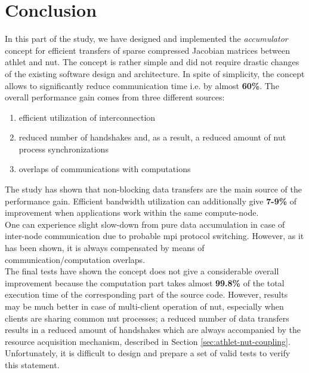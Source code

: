 \section{Conclusion}
\label{sec:accumulator-conclusions}


In this part of the study, we have designed and implemented the \textit{accumulator} concept for efficient transfers of sparse compressed Jacobian matrices between \acrshort{athlet} and \acrshort{nut}. The concept is rather simple and did not require drastic changes of the existing software design and architecture. In spite of simplicity, the concept allows to significantly reduce communication time i.e. by almost \textbf{60\%}. The overall performance gain comes from three different sources: 

\begin{enumerate}
	\item efficient utilization of interconnection
	\item reduced number of handshakes and, as a result, a reduced amount of \acrshort{nut} process synchronizations
	\item overlaps of communications with computations
\end{enumerate}

The study has shown that non-blocking data transfers are the main source of the performance gain. Efficient bandwidth utilization can additionally give \textbf{7-9\%} of improvement when applications work within the same compute-node.\\


One can experience slight slow-down from pure data accumulation in case of inter-node communication due to probable \acrshort{mpi} protocol switching. However, as it has been shown, it is always compensated by means of communication/computation overlaps.\\


The final tests have shown the concept does not give a considerable overall improvement because the computation part takes almost \textbf{99.8\%} of the total execution time of the corresponding part of the source code. However, results may be much better in case of multi-client operation of \acrshort{nut}, especially when clients are sharing common \acrshort{nut} processes; a reduced number of data transfers results in a reduced amount of handshakes which are always accompanied by the resource acquisition mechanism, described in Section \ref{sec:athlet-nut-coupling}. Unfortunately, it is difficult to design and prepare a set of valid tests to verify this statement. \\


